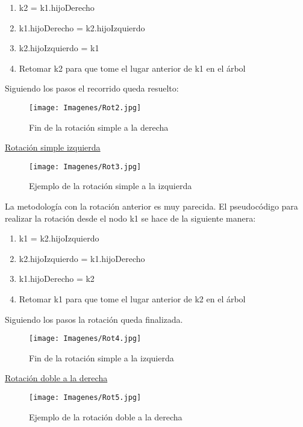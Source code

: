 \documentclass[12pt]{article}
\begin{document}
\begin{enumerate}
    \item k2 = k1.hijoDerecho
    \item k1.hijoDerecho = k2.hijoIzquierdo
    \item k2.hijoIzquierdo = k1
    \item Retomar k2 para que tome el lugar anterior de k1 en el árbol
\end{enumerate}

Siguiendo los pasos el recorrido queda resuelto:

\begin{figure}[H]
   \centering
   \texttt{[image: Imagenes/Rot2.jpg]}
   \caption{Fin de la rotación simple a la derecha}
   \label{imagen2}
\end{figure}

\underline{Rotación simple izquierda}

\begin{figure}[H]
   \centering
   \texttt{[image: Imagenes/Rot3.jpg]}
   \caption{Ejemplo de la rotación simple a la izquierda}
   \label{imagen3}
\end{figure}

La metodología con la rotación anterior es muy parecida. El pseudocódigo para realizar la rotación desde el nodo k1 se hace de la siguiente manera:

\begin{enumerate}
    \item k1 = k2.hijoIzquierdo
    \item k2.hijoIzquierdo = k1.hijoDerecho
    \item k1.hijoDerecho = k2
    \item Retomar k1 para que tome el lugar anterior de k2 en el árbol
\end{enumerate}

Siguiendo los pasos la rotación queda finalizada.

\begin{figure}[H]
   \centering
   \texttt{[image: Imagenes/Rot4.jpg]}
   \caption{Fin de la rotación simple a la izquierda}
   \label{imagen4}
\end{figure}

\underline{Rotación doble a la derecha}

\begin{figure}[H]
   \centering
   \texttt{[image: Imagenes/Rot5.jpg]}
   \caption{Ejemplo de la rotación doble a la derecha}
   \label{imagen5}
\end{figure}
\end{document}
